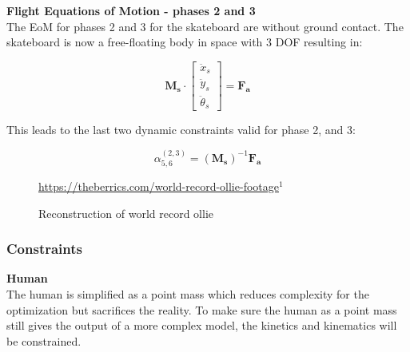 \documentclass[default,iicol]{sn-jnl}
\theoremstyle{thmstyleone}%
\theoremstyle{thmstyletwo}%
\theoremstyle{thmstylethree}%
\begin{document}
\textbf{Flight Equations of Motion - phases 2 and 3} \\
\noindent The EoM for phases 2 and 3 for the skateboard are without ground contact. The skateboard is now a free-floating body in space with 3 DOF resulting in:

\begin{equation}\label{e_eomb}
\mathbf{M_s} \cdot \left[\begin{array}{c}
         \ddot x_s  \\
         \ddot y_s \\
         \ddot \theta_s 
    \end{array}\right] =  \mathbf{F_a}
\end{equation}

This leads to the last two dynamic constraints valid for phase 2, and 3:

\begin{equation}
    \alpha_{5,6}^{(2,3)} = (\mathbf{M_s})^{-1}\mathbf{F_a}
\end{equation}

\begin{figure}[b]%
    \centering
    \quad
    \caption{Reconstruction of world record ollie} 
    \label{fig:f_record}
    \centering \footnotesize \url{https://theberrics.com/world-record-ollie-footage}$^{1}$%
\end{figure}

\subsubsection{Constraints}
\quad \textbf{Human}\\
The human is simplified as a point mass which reduces complexity for the optimization but sacrifices the reality. To make sure the human as a point mass still gives the output of a more complex model, the kinetics and kinematics will be constrained. 
\end{document}
